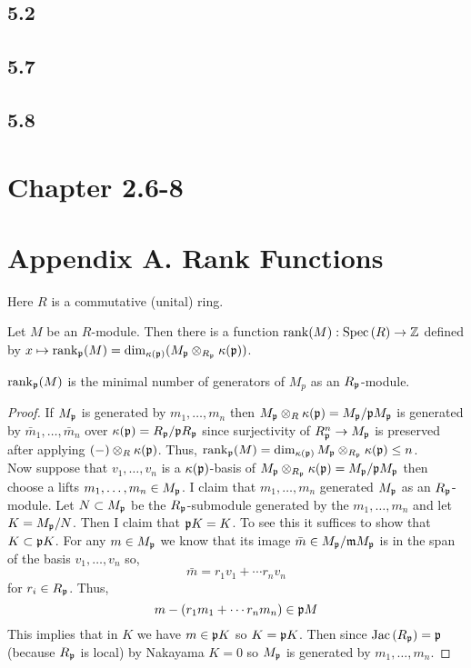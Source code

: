 \documentclass[12pt]{extarticle}
\newcommand{\rank}{\mathrm{rank}}
\newcommand{\Jac}[1]{\mathrm{Jac}\left( #1 \right)}
\begin{document}
\subsection{5.2}

\subsection{5.7}

\subsection{5.8}

\section{Chapter 2.6-8}

\section{Appendix A. Rank Functions}

\begin{remark}
Here $R$ is a commutative (unital) ring. 
\end{remark}

\begin{definition}
Let $M$ be an $R$-module. Then there is a function $\rank(M) : \Spec{R} \to \Z$ defined by $x \mapsto \rank_\p(M) = \dim_{\kappa(\p)}(M_\p \otimes_{R_\p} \kappa(\p))$. 
\end{definition}

\begin{proposition}
$\rank_\p(M)$ is the minimal number of generators of $M_p$ as an $R_{\mathfrak{p}}$-module.
\end{proposition}

\begin{proof}
If $M_{\mathfrak{p}}$ is generated by $m_1, \dots, m_n$ then $M_{\mathfrak{p}} \otimes_R \kappa(\mathfrak{p}) = M_{\mathfrak{p}} / \mathfrak{p} M_{\mathfrak{p}}$ is generated by $\bar{m}_1, \dots, \bar{m}_n$ over $\kappa(\mathfrak{p}) = R_{\mathfrak{p}} / \mathfrak{p} R_{\mathfrak{p}}$ since surjectivity of $R_{\mathfrak{p}}^n \to M_{\mathfrak{p}}$ is preserved after applying $(-) \otimes_R \kappa(\mathfrak{p})$. Thus, $\rank_\p(M) = \dim_{\kappa(\p)} M_\p \otimes_{R_\p} \kappa(\p) \le n$. 
\bigskip\\
Now suppose that $v_1, \dots, v_n$ is a $\kappa(\mathfrak{p})$-basis of $M_{\mathfrak{p}} \otimes_{R_{\mathfrak{p}}} \kappa(\mathfrak{p}) = M_{\mathfrak{p}} / \mathfrak{p} M_{\mathfrak{p}}$ then choose a lifts $m_1, \dots, m_n \in M_{\mathfrak{p}}$. I claim that $m_1, \dots, m_n$ generated $M_{\mathfrak{p}}$ as an $R_{\mathfrak{p}}$-module. Let $N \subset M_{\mathfrak{p}}$ be the $R_{\mathfrak{p}}$-submodule generated by the $m_1, \dots, m_n$ and let $K = M_{\mathfrak{p}} / N$. Then I claim that $\mathfrak{p} K = K$. To see this it suffices to show that $K \subset \mathfrak{p} K$. For any $m \in M_{\mathfrak{p}}$ we know that its image $\bar{m} \in M_{\mathfrak{p}} / \mathfrak{m} M_{\mathfrak{p}}$ is in the span of the basis $v_1, \dots, v_n$ so,
\[ \bar{m} = r_1 v_1 + \cdots r_n v_n \]
for $r_i \in R_{\mathfrak{p}}$. Thus,
\[ m - (r_1 m_1 + \cdots r_n m_n) \in \mathfrak{p} M \]
This implies that in $K$ we have $m \in \mathfrak{p} K$ so $K = \mathfrak{p} K$. Then since $\Jac{R_\p} = \p$ (because $R_{\mathfrak{p}}$ is local) by Nakayama $K = 0$ so $M_{\mathfrak{p}}$ is generated by $m_1, \dots, m_n$. 
\end{proof}
\end{document}
